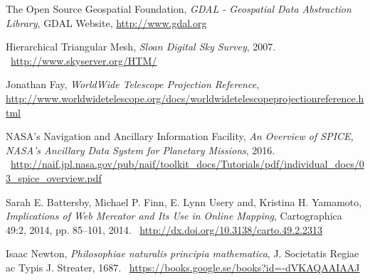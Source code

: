 \begin{thebibliography}{99}
  The Open Source Geospatial Foundation,
  \emph{GDAL - Geospatial Data Abstraction Library},
  GDAL Website,
  \url{http://www.gdal.org}

  Hierarchical Triangular Mesh,
  \emph{Sloan Digital Sky Survey},
  2007. \
  \url{http://www.skyserver.org/HTM/}
  
  Jonathan Fay,
  \emph{WorldWide Telescope Projection Reference},
  \url{http://www.worldwidetelescope.org/docs/worldwidetelescopeprojectionreference.html}

  NASA's Navigation and Ancillary Information Facility,
  \emph{An Overview of SPICE, NASA’s Ancillary Data System for Planetary Missions},
  2016. \
  \url{http://naif.jpl.nasa.gov/pub/naif/toolkit_docs/Tutorials/pdf/individual_docs/03_spice_overview.pdf}

\bibitem{battersby14}
  Sarah E. Battersby, Michael P. Finn, E. Lynn Usery and, Kristina H. Yamamoto,
  \emph{Implications of Web Mercator and Its Use in Online Mapping},
  Cartographica 49:2, 2014, pp. 85–101,
  2014. \
  \url{http://dx.doi.org/10.3138/carto.49.2.2313}

  Isaac Newton,
  \emph{Philosophiae naturalis principia mathematica},
  J. Societatis Regiae ac Typis J. Streater,
  1687. \
  \url{https://books.google.se/books?id=-dVKAQAAIAAJ}

\end{thebibliography}
